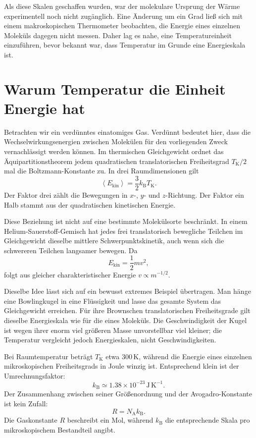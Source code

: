 Als diese Skalen geschaffen wurden, war der molekulare Ursprung der Wärme experimentell noch nicht zugänglich. Eine Änderung um ein Grad ließ sich mit einem makroskopischen Thermometer beobachten, die Energie eines einzelnen Moleküls dagegen nicht messen. Daher lag es nahe, eine Temperatureinheit einzuführen, bevor bekannt war, dass Temperatur im Grunde eine Energieskala ist.

\section{Warum Temperatur die Einheit Energie hat}

Betrachten wir ein verdünntes einatomiges Gas. Verdünnt bedeutet hier, dass die Wechselwirkungsenergien zwischen Molekülen für den vorliegenden Zweck vernachlässigt werden können. Im thermischen Gleichgewicht ordnet das Äquipartitionstheorem jedem quadratischen translatorischen Freiheitsgrad \(T_{\mathrm K}/2\) mal die Boltzmann-Konstante zu. In drei Raumdimensionen gilt
\begin{equation}
 \left\langle E_{\mathrm{kin}}\right\rangle
 =\frac{3}{2}k_{\mathrm B}T_{\mathrm K}.
 \label{eq:sm2-equipartition-kelvin}
\end{equation}
Der Faktor drei zählt die Bewegungen in \(x\)-, \(y\)- und \(z\)-Richtung. Der Faktor ein Halb stammt aus der quadratischen kinetischen Energie.

Diese Beziehung ist nicht auf eine bestimmte Molekülsorte beschränkt. In einem Helium-Sauerstoff-Gemisch hat jedes frei translatorisch bewegliche Teilchen im Gleichgewicht dieselbe mittlere Schwerpunktskinetik, auch wenn sich die schwereren Teilchen langsamer bewegen. Da
\begin{equation}
 E_{\mathrm{kin}}=\frac{1}{2}mv^2,
\end{equation}
folgt aus gleicher charakteristischer Energie \(v\propto m^{-1/2}\).

Dieselbe Idee lässt sich auf ein bewusst extremes Beispiel übertragen. Man hänge eine Bowlingkugel in eine Flüssigkeit und lasse das gesamte System das Gleichgewicht erreichen. Für ihre Brownschen translatorischen Freiheitsgrade gilt dieselbe Energieskala wie für die eines Moleküls. Die Geschwindigkeit der Kugel ist wegen ihrer enorm viel größeren Masse unvorstellbar viel kleiner; die Temperatur vergleicht jedoch Energieskalen, nicht Geschwindigkeiten.

Bei Raumtemperatur beträgt \(T_{\mathrm K}\) etwa \(300\,\mathrm K\), während die Energie eines einzelnen mikroskopischen Freiheitsgrads in Joule winzig ist. Entsprechend klein ist der Umrechnungsfaktor:
\begin{equation}
 k_{\mathrm B}\simeq 1.38\times10^{-23}\,
 \mathrm{J\,K^{-1}}.
 \label{eq:sm2-boltzmann-value}
\end{equation}
Der Zusammenhang zwischen seiner Größenordnung und der Avogadro-Konstante ist kein Zufall:
\begin{equation}
 R=N_{\mathrm A}k_{\mathrm B}.
\end{equation}
Die Gaskonstante \(R\) beschreibt ein Mol, während \(k_{\mathrm B}\) die entsprechende Skala pro mikroskopischem Bestandteil angibt.

